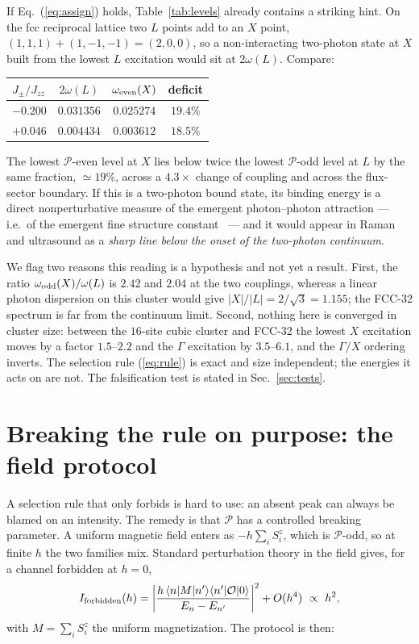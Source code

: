 \documentclass[aps,prl,preprint,amsmath,amssymb,superscriptaddress,
longbibliography,floatfix]{revtex4-2}
\newcommand{\Jzz}{J_{zz}}
\newcommand{\Jpm}{J_{\pm}}
\newcommand{\PP}{\mathcal{P}}
\begin{document}
If Eq.~(\ref{eq:assign}) holds, Table~\ref{tab:levels} already contains a
striking hint.  On the fcc reciprocal lattice two $L$ points add to an $X$
point, $(1,1,1)+(1,-1,-1)=(2,0,0)$, so a non-interacting two-photon state at
$X$ built from the lowest $L$ excitation would sit at $2\omega(L)$.  Compare:
\begin{center}
\begin{tabular}{lccc}
$\Jpm/\Jzz$ & $2\omega(L)$ & $\omega_{\rm even}(X)$ & deficit\\ \hline
$-0.200$ & $0.031356$ & $0.025274$ & $19.4\%$\\
$+0.046$ & $0.004434$ & $0.003612$ & $18.5\%$\\
\end{tabular}
\end{center}
The lowest $\PP$-even level at $X$ lies below twice the lowest $\PP$-odd level
at $L$ by the same fraction, $\simeq19\%$, across a $4.3\times$ change of
coupling and across the flux-sector boundary.  If this is a two-photon bound
state, its binding energy is a direct nonperturbative measure of the emergent
photon--photon attraction --- i.e.\ of the emergent fine structure
constant~\cite{Pace2021} --- and it would appear in Raman and ultrasound as a
\emph{sharp line below the onset of the two-photon continuum}.

We flag two reasons this reading is a hypothesis and not yet a result.  First,
the ratio $\omega_{\rm odd}(X)/\omega(L)$ is $2.42$ and $2.04$ at the two
couplings, whereas a linear photon dispersion on this cluster would give
$|X|/|L|=2/\sqrt3=1.155$; the FCC-32 spectrum is far from the continuum limit.
Second, nothing here is converged in cluster size: between the $16$-site cubic
cluster and FCC-32 the lowest $X$ excitation moves by a factor $1.5$--$2.2$
and the $\Gamma$ excitation by $3.5$--$6.1$, and the $\Gamma/X$ ordering
inverts.  The selection rule (\ref{eq:rule}) is exact and size independent; the
energies it acts on are not.  The falsification test is stated in
Sec.~\ref{sec:tests}.

\section{Breaking the rule on purpose: the field protocol}
\label{sec:field}

A selection rule that only forbids is hard to use: an absent peak can always be
blamed on an intensity.  The remedy is that $\PP$ has a controlled breaking
parameter.  A uniform magnetic field enters as $-h\sum_i S^z_i$, which is
$\PP$-odd, so at finite $h$ the two families mix.  Standard perturbation theory
in the field gives, for a channel forbidden at $h=0$,
\begin{equation}
 I_{\rm forbidden}(h)= \left|\frac{h\,\langle n|M|n'\rangle
 \langle n'|\mathcal O|0\rangle}{E_n-E_{n'}}\right|^2 + O(h^4)
 \ \propto\ h^2 ,
 \label{eq:h2}
\end{equation}
with $M=\sum_iS^z_i$ the uniform magnetization.  The protocol is then:
\end{document}
